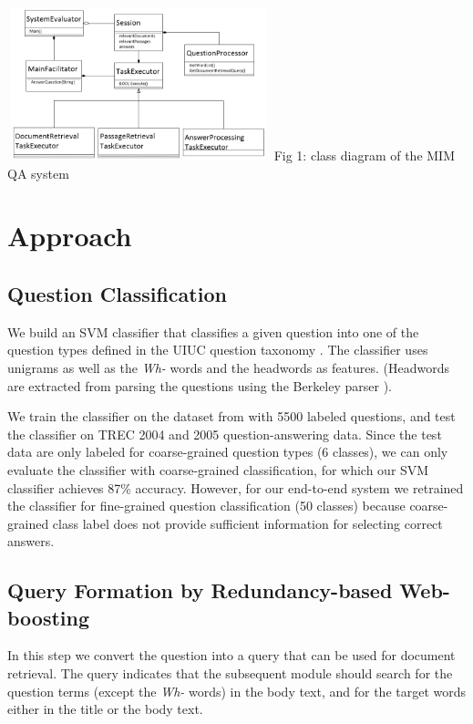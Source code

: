\documentclass[11pt]{article}
\begin{document}
\includegraphics[width=3in,height=1.75in]{MIM_class_diagram.png}
Fig 1: class diagram of the MIM QA system


\section{Approach}
\subsection{Question Classification}
We build an SVM classifier that classifies a given question into one of the question types defined in the UIUC question taxonomy \cite{uiuc}. The classifier uses unigrams as well as the {\it Wh-} words and the headwords as features. (Headwords are extracted from parsing the questions using the Berkeley parser \cite{berkeleyparser}).

We train the classifier on the dataset from \cite{uiuc} with 5500 labeled questions, and test the classifier on TREC 2004 and 2005 question-answering data. Since the test data are only labeled for coarse-grained question types (6 classes), we can only evaluate the classifier with coarse-grained classification, for which our SVM classifier achieves 87\% accuracy. However, for our end-to-end system we retrained the classifier for fine-grained question classification (50 classes) because coarse-grained class label does not provide sufficient information for selecting correct answers.

\subsection{Query Formation by Redundancy-based Web-boosting}
In this step we convert the question into a query that can be used for document retrieval. The query indicates that the subsequent module should search for the question terms (except the {\it Wh-} words) in the body text, and for the target words either in the title or the body text.
\end{document}
